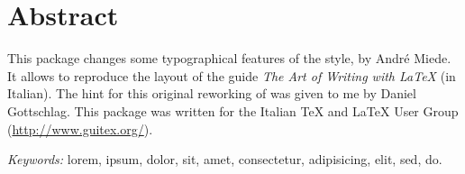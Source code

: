 
\begingroup
\let\clearpage\relax
\let\cleardoublepage\relax
\let\cleardoublepage\relax

\chapter*{Abstract}
\rmfamily


This package changes some typographical features of the \classicthesis{} style, by André Miede. It allows to reproduce the layout of the guide \emph{The Art of Writing with \LaTeX} (in Italian).  The hint for this original reworking of \classicthesis{} was given to me by Daniel Gottschlag. This package was written for the Italian \TeX{} and \LaTeX{} User Group (\url{http://www.guitex.org/}).

\noindent
{\it Keywords:} lorem, ipsum, dolor, sit, amet, consectetur, adipisicing, elit, sed, do.

\vfill

\endgroup	
